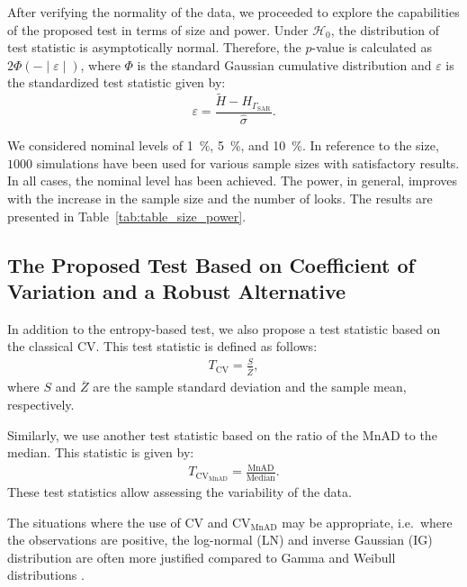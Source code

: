\documentclass[remotesensing,article,submit,moreauthors,pdftex]{Definitions/mdpi}
\begin{document}
After verifying the normality of the data, we proceeded to explore the
capabilities of the proposed test in terms of size and power. Under
\(\mathcal{H}_0\), the distribution of test statistic is asymptotically
normal. Therefore, the \(p\)-value is calculated as
\(2\Phi(-\mid \varepsilon\mid)\), where \(\Phi\) is the standard
Gaussian cumulative distribution and \(\varepsilon\) is the standardized
test statistic given by: \[
\varepsilon=\frac{\tilde{H}-H_{\Gamma_{\text{SAR}}}}{\hat\sigma}.
\]

We considered nominal levels of \SI{1}{\percent}, \SI{5}{\percent}, and
\SI{10}{\percent}. In reference to the size, \(1000\) simulations have
been used for various sample sizes with satisfactory results. In all
cases, the nominal level has been achieved. The power, in general,
improves with the increase in the sample size and the number of looks.
The results are presented in Table~\ref{tab:table_size_power}.

\hypertarget{the-proposed-test-based-on-coefficient-of-variation-and-a-robust-alternative}{%
\subsection{The Proposed Test Based on Coefficient of Variation and a
Robust
Alternative}\label{the-proposed-test-based-on-coefficient-of-variation-and-a-robust-alternative}}

In addition to the entropy-based test, we also propose a test statistic
based on the classical CV. This test statistic is defined as follows:
\begin{align}
    T_{\text{CV}}=\frac{S}{\overline{Z}},
\end{align} where \(S\) and \(\overline{Z}\) are the sample standard
deviation and the sample mean, respectively.

Similarly, we use another test statistic based on the ratio of the MnAD
to the median. This statistic is given by: \begin{align}
    T_{\text{CV}_{\text{MnAD}}}=\frac{\text{MnAD}}{\text{Median}}.
\end{align} These test statistics allow assessing the variability of the
data.

The situations where the use of CV and \(\text{CV}_{\text{MnAD}}\) may
be appropriate, i.e.~where the observations are positive, the log-normal
(LN) and inverse Gaussian (IG) distribution are often more justified
compared to Gamma and Weibull distributions
\cite{Chaubey2017,takagi1997application}.
\end{document}
